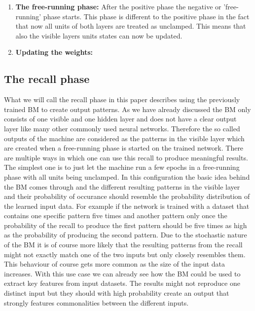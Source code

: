\documentclass[12pt,twoside]{article}
\theoremstyle{plain}
\theoremstyle{definition}
\theoremstyle{remark}
\begin{document}
\begin{enumerate}
    \item \textbf{The free-running phase:}\newline
        After the positive phase the negative or 'free-running' phase starts. This phase is different to the positive phase in the fact that
        now all units of both layers are treated as unclamped. This means that also the visible layers units states can now be updated.

    \item \textbf{Updating the weights:}\newline
        \cite[Chapter~43]{MacKay}
\end{enumerate}



\subsection{The recall phase}

What we will call the recall phase in this paper describes using the previously trained BM to create output patterns.
As we have already discussed the BM only consists of one visible and one hidden layer and does not have a clear output
layer like many other commonly used neural networks. Therefore the so called outputs of the machine are considered as the patterns
in the visible layer which are created when a free-running phase is started on the trained network.
There are multiple ways in which one can use this recall to produce meaningful results. The simplest one is to just let the
machine run a few epochs in a free-running phase with all units being unclamped. In this configuration the basic idea behind the
BM comes through and the different resulting patterns in the visible layer and their probability of occurance should
resemble the probability distribution of the learned input data. For example if the network is trained with a dataset
that contains one specific pattern five times and another pattern only once the probability of the recall to produce the first
pattern should be five times as high as the probability of producing the second pattern. Due to the stochastic nature of the BM
it is of course more likely that the resulting patterns from the recall might not exactly match one of the two inputs
but only closely resembles them. This behaviour of course gets more common as the size of the input data increases.
With this use case we can already see how the BM could be used to extract key features from input datasets.
The results might not reproduce one distinct input but they should with high probability create an output that strongly
features commonalities between the different inputs.
\end{document}
